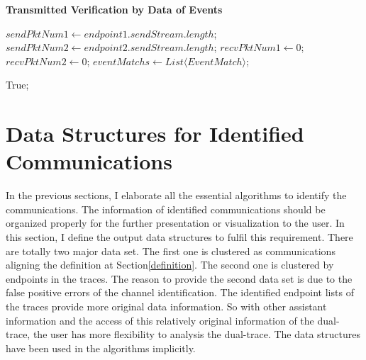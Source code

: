 \begin{algorithm}[H]
\DontPrintSemicolon
\caption{{\bf Transmitted Verification by Data of Events } \label{dataAlg2}}
$sendPktNum1 \leftarrow endpoint1.sendStream.length$;\;
$sendPktNum2 \leftarrow endpoint2.sendStream.length$;\;
$recvPktNum1 \leftarrow 0$;\;
$recvPktNum2 \leftarrow 0$;\;
$eventMatchs \leftarrow List \langle EventMatch \rangle$;\;



 \KwRet True;\;
\end{algorithm}



\section{Data Structures for Identified Communications}
In the previous sections, I elaborate all the essential algorithms to identify the communications. The information of identified communications should be organized properly for the further presentation or visualization to the user. In this section, I define the output data structures to fulfil this requirement. There are totally two major data set. The first one is clustered as communications aligning the definition at Section\ref{definition}. The second one is clustered by endpoints in the traces. The reason to provide the second data set is due to the false positive errors of the channel identification. The identified endpoint lists of the traces provide more original data information. So with other assistant information and the access of this relatively original information of the dual-trace, the user has more flexibility to analysis the dual-trace. The data structures have been used in the algorithms implicitly.

